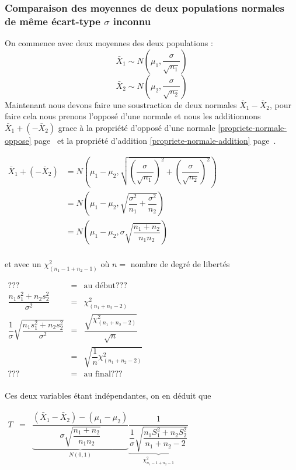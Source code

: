\subsubsection{Comparaison des moyennes de deux populations normales de même écart-type $\sigma$ inconnu}
On commence avec deux moyennes des deux populations :
$$\bar{X}_1 \sim N \left( \mu_1, \dfrac{\sigma}{\sqrt{n_1}} \right)$$
$$\bar{X}_2 \sim N \left( \mu_2, \dfrac{\sigma}{\sqrt{n_2}} \right)$$
Maintenant nous devons faire une soustraction de deux normales $\bar{X}_1 - \bar{X}_2$, pour faire cela nous prenons l'opposé d'une normale et nous les additionnons $\bar{X}_1 + (-\bar{X}_2)$ grace à la propriété d'opposé d'une normale \ref{propriete-normale-oppose} page~\pageref{propriete-normale-oppose} et la propriété d'addition \ref{propriete-normale-addition} page~\pageref{propriete-normale-addition}.
\begin{center}
$\begin{array}{LL}
\bar{X}_1 + (-\bar{X}_2) &= N \left( \mu_1 - \mu_2, \sqrt{\left(\dfrac{\sigma}{\sqrt{n_1}}\right)^2 + \left(\dfrac{\sigma}{\sqrt{n_2}}\right)^2} \right)\\
                      &= N \left( \mu_1 - \mu_2, \sqrt{\dfrac{\sigma^2}{n_1} + \dfrac{\sigma^2}{n_2}} \right)\\
                      &= N \left( \mu_1 - \mu_2, \sigma\sqrt{\dfrac{n_1 + n_2}{n_1 n_2}} \right)\\
\end{array}$
\end{center}
et avec un $\chi^2_{(n_1-1+n_2-1)}$ où $n =$ nombre de degré de libertés
\begin{center}
$\begin{array}{LCL}
??? &=& \text{au début}???\\
\dfrac{n_1s_1^2 + n_2s_2^2}{\sigma^2} &=& \chi^2_{(n_1+n_2-2)}\\
\dfrac{1}{\sigma}\sqrt{\dfrac{n_1s_1^2+n_2s_2^2}{\sigma^2}}&=&\dfrac{\sqrt{\chi^2_{(n_1+n_2-2)}}}{\sqrt{n}}\\
&=& \sqrt{\dfrac{1}{n}\chi^2_{(n_1+n_2-2)}}\\
??? &=& \text{au final}???\\
\end{array}$
\end{center}
Ces deux variables étant indépendantes, on en déduit que
\begin{center}
$\begin{array}{LCL}
T &=& \underbrace{\dfrac{(\bar{X}_1 - \bar{X}_2) - (\mu_1 - \mu_2)}{\sigma\sqrt{\dfrac{n_1+n_2}{n_1n_2}}}}_{\displaystyle N(0,1)} \underbrace{\dfrac{1}{\dfrac{1}{\sigma}\sqrt{\dfrac{n_1S^2_1+n_2S_2^2}{n_1+n_2-2}}}}_{\displaystyle\chi_{n_1-1+n_2-1}^2}\\
\end{array}$
\end{center}
